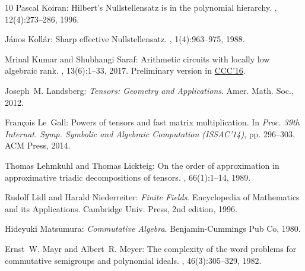 \documentclass[11pt]{article}
\numberwithin{equation}{section}
\theoremstyle{definition}
\theoremstyle{plain}
\begin{document}
\begin{thebibliography}{10}
{\sc Pascal Koiran}: Hilbert's {N}ullstellensatz is in the polynomial
  hierarchy.
, 12(4):273--286, 1996.

{\sc J{\'a}nos Koll{\'a}r}: Sharp effective {N}ullstellensatz.
, 1(4):963--975, 1988.
\newblock [\epfmtdoi{10.2307/1990996}]

{\sc Mrinal Kumar and Shubhangi Saraf}: Arithmetic circuits with locally low
  algebraic rank.
, 13(6):1--33, 2017.
\newblock Preliminary version in
  \href{http://drops.dagstuhl.de/opus/volltexte/2016/5828/}{CCC'16}.

{\sc Joseph~M. Landsberg}: {\em Tensors: Geometry and Applications}.
\newblock Amer. Math. Soc., 2012.

{\sc Fran{\c{c}}ois Le~Gall}: Powers of tensors and fast matrix multiplication.
\newblock In {\em Proc. 39th Internat. Symp. Symbolic and Algebraic Computation
  (ISSAC'14)}, pp. 296--303. ACM Press, 2014.

{\sc Thomas Lehmkuhl and Thomas Lickteig}: On the order of approximation in
  approximative triadic decompositions of tensors.
, 66(1):1--14, 1989.
\newblock [\epfmtdoi{10.1016/0304-3975(89)90141-2}]

{\sc Rudolf Lidl and Harald Niederreiter}: {\em Finite Fields}.
\newblock Encyclopedia of Mathematics and its Applications. Cambridge Univ.
  Press, 2nd edition, 1996.

{\sc Hideyuki Matsumura}: {\em Commutative Algebra}.
\newblock Benjamin-Cummings Pub Co, 1980.

{\sc Ernst~W. Mayr and Albert~R. Meyer}: The complexity of the word problems
  for commutative semigroups and polynomial ideals.
, 46(3):305--329, 1982.
\newblock [\epfmtdoi{10.1016/0001-8708(82)90048-2}]


\end{thebibliography}
\end{document}
